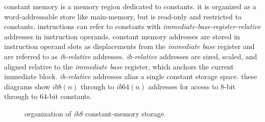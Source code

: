 constant memory is a memory region dedicated to constants. it is organized
as a word-addressable store like main-memory, but is read-only and
restricted to constants. instructions can refer to constants with
\emph{immediate-base-register-relative} addresses in instruction operands.
\para
constant memory addresses are stored in instruction operand slots as
displacements from the \emph{immediate base} register and are referred to
as \emph{ib-relative} addresses. \emph{ib-relative} addresses are sized,
scaled, and aligned relative to the \emph{immediate
base} register, which anchors the current immediate block.
\emph{ib-relative} addresses alias a single constant storage space.
these diagrams show $ib8(n)$ through to $ib64(n)$ addresses for access
to 8-bit through to 64-bit constants.
\\
\begin{figure}[H]
\centering
{}
\caption{organization of \emph{ib8} constant-memory storage.}
\label{fig:constant-memory-ib8-organization}
\end{figure}

